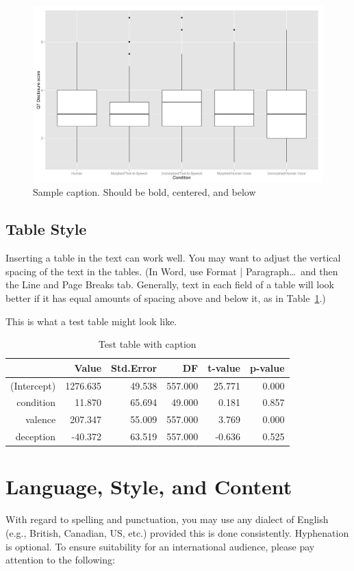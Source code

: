\documentclass{icis}
\begin{document}
\begin{figure}[h]
  \centering
  \includegraphics[scale = 0.45]{testimage.png}
  \caption{Sample caption. Should be bold, centered, and below} 
  \label{fig:test}
\end{figure}


\subsection{Table Style}
Inserting a table in the text can work well. You may want to adjust the vertical
spacing of the text in the tables. (In Word, use Format | Paragraph\ldots~and
then the Line and Page Breaks tab. Generally, text in each field of a table will
look better if it has equal amounts of spacing above and below it, as in
Table~\ref{tab:lme-mean}.)

This is what a test table might look like. 

\begin{table}[ht]
\centering
\begin{tabular}{rrrrrr}
  \hline
 & Value & Std.Error & DF & t-value & p-value \\ 
  \hline
(Intercept) & 1276.635 & 49.538 & 557.000 & 25.771 & 0.000 \\ 
  condition & 11.870 & 65.694 & 49.000 & 0.181 & 0.857 \\ 
  valence & 207.347 & 55.009 & 557.000 & 3.769 & 0.000 \\ 
  deception & -40.372 & 63.519 & 557.000 & -0.636 & 0.525 \\ 
   \hline
\end{tabular}
\caption{Test table with caption} 
\label{tab:lme-mean}
\end{table}

\section{Language, Style, and Content}
With regard to spelling and punctuation, you may use any dialect of English
(e.g., British, Canadian, US, etc.) provided this is done
consistently. Hyphenation is optional. To ensure suitability for an
international audience, please pay attention to the following:
\end{document}
